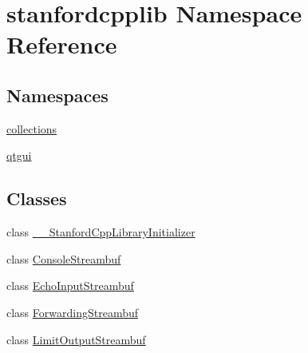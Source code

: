 \hypertarget{namespacestanfordcpplib}{}\section{stanfordcpplib Namespace Reference}
\label{namespacestanfordcpplib}
\subsection*{Namespaces}
\begin{DoxyCompactItemize}
\item 
 \mbox{\hyperlink{namespacestanfordcpplib_1_1collections}{collections}}
\item 
 \mbox{\hyperlink{namespacestanfordcpplib_1_1qtgui}{qtgui}}
\end{DoxyCompactItemize}
\subsection*{Classes}
\begin{DoxyCompactItemize}
\item 
class \mbox{\hyperlink{classstanfordcpplib_1_1____StanfordCppLibraryInitializer}{\+\_\+\+\_\+\+Stanford\+Cpp\+Library\+Initializer}}
\item 
class \mbox{\hyperlink{classstanfordcpplib_1_1ConsoleStreambuf}{Console\+Streambuf}}
\item 
class \mbox{\hyperlink{classstanfordcpplib_1_1EchoInputStreambuf}{Echo\+Input\+Streambuf}}
\item 
class \mbox{\hyperlink{classstanfordcpplib_1_1ForwardingStreambuf}{Forwarding\+Streambuf}}
\item 
class \mbox{\hyperlink{classstanfordcpplib_1_1LimitOutputStreambuf}{Limit\+Output\+Streambuf}}
\end{DoxyCompactItemize}
